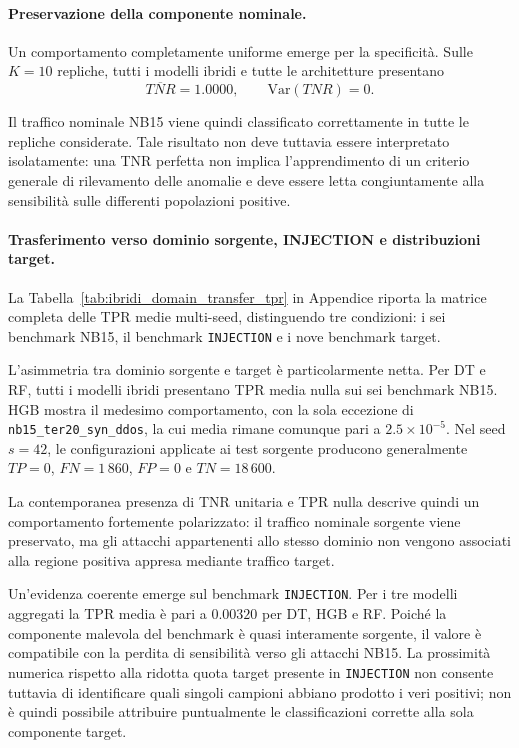 \paragraph{Preservazione della componente nominale.}
Un comportamento completamente uniforme emerge per la specificità. 
Sulle $K=10$ repliche, tutti i modelli ibridi e tutte le architetture presentano
\[
    \overline{TNR}=1.0000,
    \qquad
    \mathrm{Var}(TNR)=0.
\]

Il traffico nominale NB15 viene quindi classificato correttamente in tutte le repliche considerate. 
Tale risultato non deve tuttavia essere interpretato isolatamente: una TNR perfetta non implica l'apprendimento di un criterio generale di rilevamento delle anomalie e deve essere letta congiuntamente alla sensibilità sulle differenti popolazioni positive.

\paragraph{Trasferimento verso dominio sorgente, INJECTION e distribuzioni target.}
La Tabella~\ref{tab:ibridi_domain_transfer_tpr} in Appendice riporta la matrice completa delle TPR medie multi-seed, distinguendo tre condizioni: i sei benchmark NB15, il benchmark \texttt{INJECTION} e i nove benchmark target.

L'asimmetria tra dominio sorgente e target è particolarmente netta. 
Per DT e RF, tutti i modelli ibridi presentano TPR media nulla sui sei benchmark NB15. 
HGB mostra il medesimo comportamento, con la sola eccezione di \texttt{nb15\_ter20\_syn\_ddos}, la cui media rimane comunque pari a $2.5\times10^{-5}$. 
Nel seed $s=42$, le configurazioni applicate ai test sorgente producono generalmente $TP=0$, $FN=1\,860$, $FP=0$ e $TN=18\,600$.

La contemporanea presenza di TNR unitaria e TPR nulla descrive quindi un comportamento fortemente polarizzato: il traffico nominale sorgente viene preservato, ma gli attacchi appartenenti allo stesso dominio non vengono associati alla regione positiva appresa mediante traffico target.

Un'evidenza coerente emerge sul benchmark \texttt{INJECTION}. 
Per i tre modelli aggregati la TPR media è pari a $0.00320$ per DT, HGB e RF. 
Poiché la componente malevola del benchmark è quasi interamente sorgente, il valore è compatibile con la perdita di sensibilità verso gli attacchi NB15. 
La prossimità numerica rispetto alla ridotta quota target presente in \texttt{INJECTION} non consente tuttavia di identificare quali singoli campioni abbiano prodotto i veri positivi; non è quindi possibile attribuire puntualmente le classificazioni corrette alla sola componente target.

